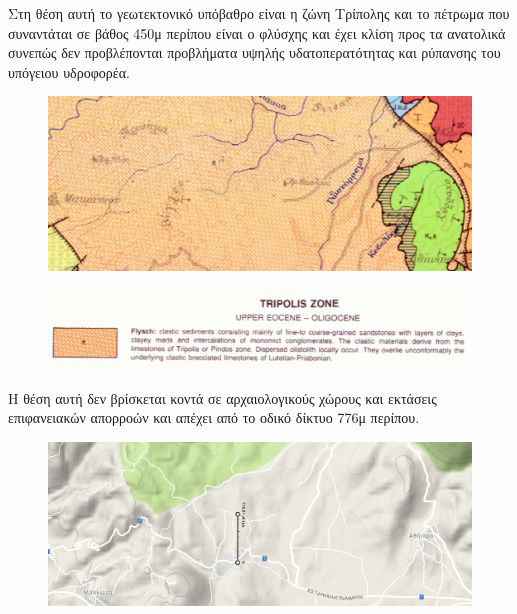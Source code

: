 \documentclass[12pt]{article}
\begin{document}
	Στη θέση αυτή το γεωτεκτονικό υπόβαθρο είναι η ζώνη Τρίπολης και το πέτρωμα που συναντάται σε βάθος 450μ περίπου είναι ο φλύσχης και έχει κλίση προς τα ανατολικά συνεπώς δεν προβλέπονται προβλήματα υψηλής υδατοπερατότητας και ρύπανσης του υπόγειου υδροφορέα.
	
	\begin{figure} [H]
		\begin{center}
			\includegraphics [scale = 0.30] {map9.png}
		\end{center}
	\end{figure}

	\begin{figure} [H]
		\begin{center}
			\includegraphics [scale = 0.30] {explain1.png}
		\end{center}
	\end{figure}

	Η θέση αυτή δεν βρίσκεται κοντά σε αρχαιολογικούς χώρους και εκτάσεις επιφανειακών απορροών και απέχει από το οδικό δίκτυο 776μ περίπου.
	
	\begin{figure} [H]
		\begin{center}
			\includegraphics [scale = 0.30] {map10.png}
		\end{center}
	\end{figure}
\end{document}
